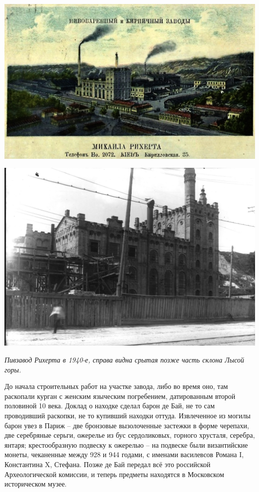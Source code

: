 \begin{center}
\includegraphics[width=\linewidth]{chast-kirvys/lys02/rihert-dorev.jpg}
\end{center}

\begin{center}
\includegraphics[width=\linewidth]{chast-kirvys/lys02/1940-riherta.jpg}

\textit{Пивзавод Рихерта в 1940-е, справа видна срытая позже часть склона Лысой горы.}
\end{center}

До начала строительных работ на участке завода, либо во время оно, там раскопали курган с женским языческим погребением, датированным второй половиной 10 века. Доклад о находке сделал барон де Бай, не то сам проводивший раскопки, не то купивший находки оттуда. Извлеченное из могилы барон увез в Париж – две бронзовые вызолоченные застежки в форме черепахи, две серебряные серьги, ожерелье из бус сердоликовых, горного хрусталя, серебра, янтаря; крестообразную подвеску к ожерелью – на подвеске были византийские монеты, чеканенные между 928 и 944 годами, с именами василевсов Романа I, Константина X, Стефана. Позже де Бай передал всё это российской Археологической комиссии, и теперь предметы находятся в Московском историческом музее.

